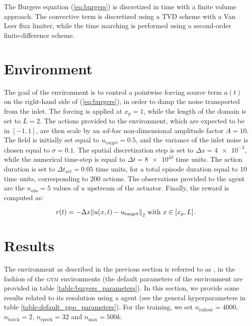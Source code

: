 The Burgers equation (\ref{eq:burgers}) is discretized in time with a finite volume approach. The convective term is discretized using a TVD scheme with a Van Leer flux limiter, while the time marching is performed using a second-order finite-difference scheme.

\section{Environment}

The goal of the environment is to control a pointwise forcing source term $a(t)$ on the right-hand side of (\ref{eq:burgers}), in order to damp the noise transported from the inlet. The forcing is applied at $x_p = 1$, while the length of the domain is set to $L=2$. The actions provided to the environment, which are expected to be in $\left[-1, 1\right]$, are then scale by an \textit{ad-hoc} non-dimensional amplitude factor $A=10$. The field is initially set equal to $u_\text{target} = 0.5$, and the variance of the inlet noise is chosen equal to $\sigma = 0.1$. The spatial discretization step is set to $\Delta x = \num{4e-3}$, while the numerical time-step is equal to $\Delta t = \num{8e43}$ time units. The action duration is set to $\Delta t_\text{act} = 0.05$ time units, for a total episode duration equal to $10$ time units, corresponding to $200$ actions. The observations provided to the agent are the $n_\text{obs} = 5$ values of $u$ upstream of the actuator. Finally, the reward is computed as:

\begin{equation}
\label{eq:burgers_reward}
	r(t) = - \Delta x \norm{u(x,t) - u_\text{target}}_2 \text{ with } x \in \left[ x_p, L \right].
\end{equation}

\section{Results}

The environment as described in the previous section is referred to as , in the fashion of the \textsc{gym} environments (the default parameters of the environment are provided in table \ref{table:burgers_parameters}). In this section, we provide some results related to its resolution using a \ppo agent (see the general hyperparameters in table \ref{table:default_ppo_parameters}). For the training, we set $n_\text{rollout} = 4000$, $n_\text{batch} = 2$, $n_\text{epoch} = 32$ and $n_\text{max} = 500k$.

